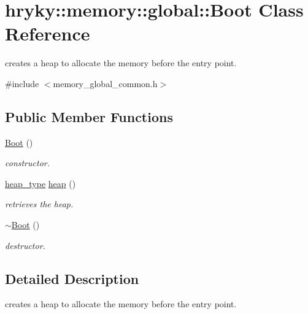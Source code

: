 \hypertarget{classhryky_1_1memory_1_1global_1_1_boot}{\section{hryky\-:\-:memory\-:\-:global\-:\-:Boot Class Reference}
\label{classhryky_1_1memory_1_1global_1_1_boot}
}


creates a heap to allocate the memory before the entry point.  




{\ttfamily \#include $<$memory\-\_\-global\-\_\-common.\-h$>$}

\subsection*{Public Member Functions}
\begin{DoxyCompactItemize}
\item 
\hyperlink{classhryky_1_1memory_1_1global_1_1_boot_af8a73189ccbab7dd2e5b14517efa4a68}{Boot} ()
\begin{DoxyCompactList}\small\item\em constructor. \end{DoxyCompactList}\item 
\hypertarget{classhryky_1_1memory_1_1global_1_1_boot_a9e38ca182b6e93d9dc118386c91edfc3}{\hyperlink{classhryky_1_1memory_1_1heap_1_1_base}{heap\-\_\-type} \hyperlink{classhryky_1_1memory_1_1global_1_1_boot_a9e38ca182b6e93d9dc118386c91edfc3}{heap} ()}\label{classhryky_1_1memory_1_1global_1_1_boot_a9e38ca182b6e93d9dc118386c91edfc3}

\begin{DoxyCompactList}\small\item\em retrieves the heap. \end{DoxyCompactList}\item 
\hypertarget{classhryky_1_1memory_1_1global_1_1_boot_ab8f241478f7c2446ce01267202774b3b}{\hyperlink{classhryky_1_1memory_1_1global_1_1_boot_ab8f241478f7c2446ce01267202774b3b}{$\sim$\-Boot} ()}\label{classhryky_1_1memory_1_1global_1_1_boot_ab8f241478f7c2446ce01267202774b3b}

\begin{DoxyCompactList}\small\item\em destructor. \end{DoxyCompactList}\end{DoxyCompactItemize}


\subsection{Detailed Description}
creates a heap to allocate the memory before the entry point. 

